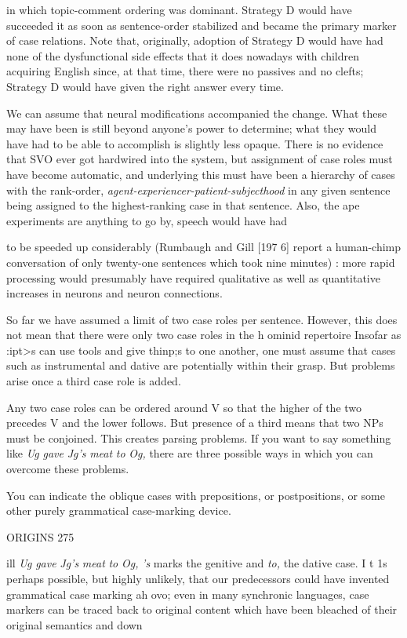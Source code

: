 in which topic-comment ordering was dominant. Strategy D would have succeeded it as soon as sentence-order stabilized and became the pri\-mary marker of case relations. Note that, originally, adoption of Stra\-tegy D would have had none of the dysfunctional side effects that it does nowadays with children acquiring English since, at that time, there were no passives and no clefts; Strategy D would have given the right answer every time.

We can assume that neural modifications accompanied the change. What these may have been is still beyond anyone's power to determine; what they would have had to be able to accomplish is slightly less opaque. There is no evidence that SVO ever got hardwired into the system, but assignment of case roles must have become auto\-matic, and underlying this must have been a hierarchy of cases with the rank-order, \textit{agent-experiencer-patient-su}\textit{b}\textit{jecthood }in any given sen\-tence being assigned to the highest-ranking case in that sentence. Also, the ape experiments are anything to go by, speech would have had

to be speeded up considerably (Rumbaugh and Gill [197 6] report a human-chimp conversation of only twenty-one sentences which took nine minutes) : more rapid processing would presumably have required qualitative as well as quantitative increases in neurons and neuron connections.

So far we have assumed a limit of two case roles per sentence. However, this does not mean that there were only two case roles in the h ominid repertoire Insofar as :ipt{\textgreater}s can use tools and give thinp;s to one another, one must assume that cases such as instrumental and dative are potentially within their grasp. But problems arise once a third case role is added.

Any two case roles can be ordered around V so that the higher of the two precedes V and the lower follows. But presence of a third means that two NPs must be conjoined. This creates parsing problems. If you want to say something like \textit{Ug} \textit{gave} \textit{Jg's} \textit{meat} \textit{to} \textit{Og,} there are three possible ways in which you can overcome these problems.

You can indicate the oblique cases with prepositions, or post\-positions, or some other purely grammatical case-marking device.

ORIGINS 275

ill \textit{Ug} \textit{gave} \textit{Jg's} \textit{meat} \textit{to} \textit{Og,} \textit{'s} marks the genitive and \textit{to,} the dative case. I t 1s perhaps possible, but highly unlikely, that our predecessors could have invented grammatical case marking ah ovo; even in many syn\-chronic languages, case markers can be traced back to original content which have been bleached of their original semantics and down\-

